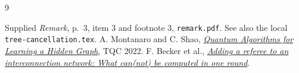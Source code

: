 \documentclass[11pt]{article}
\begin{document}
\begin{thebibliography}{9}
\raggedright
{} Supplied \emph{Remark}, p.~3, item 3 and footnote 3,
\texttt{remark.pdf}. See also the local \texttt{tree-cancellation.tex}.
 A. Montanaro and C. Shao, \href{https://doi.org/10.4230/LIPIcs.TQC.2022.1}
{\emph{Quantum Algorithms for Learning a Hidden Graph}}, TQC 2022.
 F. Becker et al., \href{https://arxiv.org/abs/1009.4447}
{\emph{Adding a referee to an interconnection network: What can(not) be
computed in one round}}.
\end{thebibliography}
\end{document}
